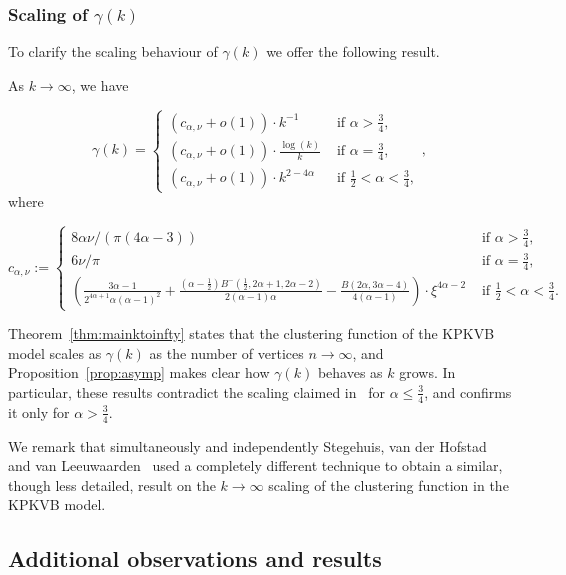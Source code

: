 \subsubsection{Scaling of \texorpdfstring{$\gamma(k)$}{gamma(k)}}


To clarify the scaling behaviour of $\gamma(k)$ we offer the following result.

\begin{proposition}\label{prop:asymp}
As $k\to\infty$, we have

$$ \gamma(k) = 
\left\{ \begin{array}{ll}
(c_{\alpha,\nu}+o(1)) \cdot k^{-1} &\text{ if } \alpha > \frac{3}{4}, \\
(c_{\alpha,\nu}+o(1)) \cdot \frac{\log(k)}{k}& \text{ if } \alpha = \frac{3}{4},\\
(c_{\alpha,\nu}+o(1)) \cdot k^{2-4\alpha} & \text{ if } \frac12 < \alpha < \frac34, 
\end{array} \right.,
$$
where 

$$ c_{\alpha,\nu} := 
\left\{ \begin{array}{cl}
8\alpha \nu / (\pi\left(4\alpha - 3\right)) & \text{ if } \alpha > \frac{3}{4}, \\
6 \nu / \pi & \text{ if } \alpha = \frac{3}{4},\\
 \left( \frac{3\alpha - 1}{2^{4\alpha+1}\alpha(\alpha-1)^2} 
	+ \frac{(\alpha - \frac{1}{2})B^-(\frac{1}{2},2\alpha + 1, 2\alpha - 2)}{2(\alpha - 1)\alpha} 
	- \frac{B(2\alpha, 3\alpha - 4)}{4(\alpha - 1)} \right)  \cdot \xi^{4\alpha-2} 
	& \text{ if } \frac12 < \alpha < \frac34.
\end{array} \right. $$
\end{proposition}

Theorem~\ref{thm:mainktoinfty} states that the clustering function of the KPKVB model scales as $\gamma(k)$ as the number of vertices $n\to\infty$, and
Proposition~\ref{prop:asymp} makes clear how $\gamma(k)$ behaves as $k$ grows.
In particular, these results contradict the scaling claimed in~\cite{krioukov2010hyperbolic} for 
$\alpha \leq \frac{3}{4}$, and confirms it only for $\alpha > \frac{3}{4}$.

We remark that simultaneously and independently Stegehuis, van der Hofstad and van Leeuwaarden~\cite{stegehuis2019scale} used a completely different technique to obtain a similar, though less detailed, result on the $k\to\infty$ scaling of the clustering function in the KPKVB model.


\subsection{Additional observations and results}


